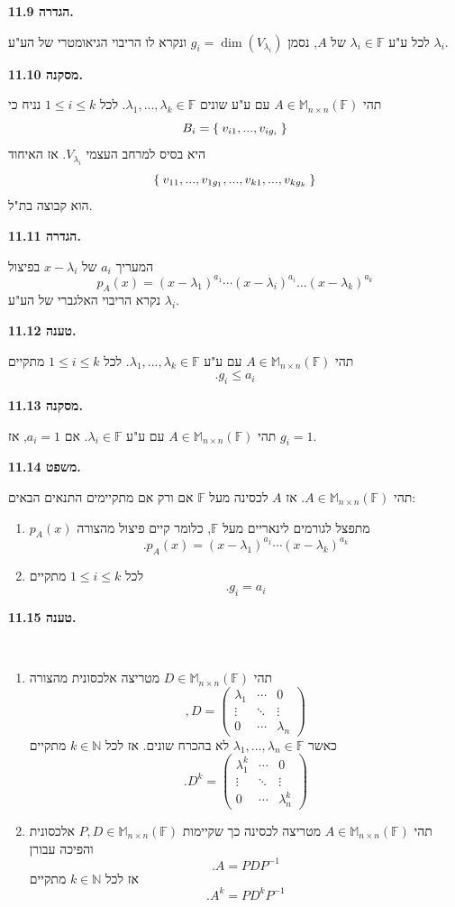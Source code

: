 \documentclass[12pt]{report}
\theoremstyle{plain}
\theoremstyle{definition}
\newcommand{\N}{\mathbb{N}}
\newcommand{\F}{\mathbb{F}}
\newcommand{\M}{\mathbb{M}}
\newcommand{\0}{\mathbf{0}}
\begin{document}
\noindent\textbf{הגדרה 11.9.}

לכל ע"ע
$\lambda_i\in\F$
של
$A$,
נסמן
$g_i=\dim(V_{\lambda_i})$
ונקרא לו הריבוי הגיאומטרי של הע"ע
$\lambda_i$.
\bigskip
\bigskip

\noindent\textbf{מסקנה 11.10.}

תהי
$A\in\M_{n\times n}(\F)$
עם ע"ע שונים
$\lambda_1,...,\lambda_k\in\F$.
לכל 
$1\leq i\leq k$
נניח כי
$$
B_i=\Set{v_{i1},...,v_{ig_i}}
$$
היא בסיס למרחב העצמי 
$V_{\lambda_i}$.
אז האיחוד
$$
\Set{v_{11},...,v_{1g_1},...,v_{k1},...,v_{kg_k}}
$$
הוא קבוצה בת"ל.
\bigskip
\bigskip

\noindent\textbf{הגדרה 11.11.}

המעריך 
$a_i$
של
$x-\lambda_i$
בפיצול
$$
p_A(x)=(x-\lambda_1)^{a_1}\cdots(x-\lambda_i)^{a_i}\dots(x-\lambda_k)^{a_k}
$$
נקרא הריבוי האלגברי של הע"ע
$\lambda_i$.
\bigskip
\bigskip

\noindent\textbf{טענה 11.12.}

תהי
$A\in\M_{n\times n}(\F)$
עם ע"ע
$\lambda_1,...,\lambda_k\in\F$.
לכל
$1\leq i\leq k$
מתקיים
$$
.g_i\leq a_i
$$
\bigskip
\bigskip

\noindent\textbf{מסקנה 11.13.}

תהי
$A\in\M_{n\times n}(\F)$
עם ע"ע
$\lambda_i\in\F$.
אם
$a_i=1$,
אז 
$g_i=1$.
\bigskip
\bigskip

\noindent\textbf{משפט 11.14.}

תהי
$A\in\M_{n\times n}(\F)$.
אז
$A$
לכסינה מעל
$\F$
אם ורק אם מתקיימים התנאים הבאים:
\begin{enumerate}[label=\alph*.]
\item 
$p_A(x)$
מתפצל לגורמים לינאריים מעל
$\F$, 
כלומר קיים פיצול מהצורה
$$
.p_A(x)=(x-\lambda_1)^{a_1}\cdots(x-\lambda_k)^{a_k}
$$


\item 
לכל
$1\leq i\leq k$
מתקיים
$$
.g_i=a_i
$$


\end{enumerate}
\bigskip
\bigskip

\noindent\textbf{טענה 11.15.}

\label{prop:matrix-power}\
\begin{enumerate}[label=\alph*.]
\item 
תהי
$D\in\M_{n\times n}(\F)$
מטריצה אלכסונית מהצורה
$$
,D=\begin{pmatrix}
\lambda_1 & \cdots & 0 \\
\vdots & \ddots & \vdots \\
0 & \cdots & \lambda_n
\end{pmatrix}
$$
כאשר 
$\lambda_1,...,\lambda_n\in\F$
לא בהכרח שונים.
אז לכל
$k\in\N$
מתקיים
$$
.D^k=\begin{pmatrix}
\lambda_1^k & \cdots & 0 \\
\vdots & \ddots & \vdots \\
0 & \cdots & \lambda_n^k
\end{pmatrix}
$$


\item 
תהי
$A\in\M_{n\times n}(\F)$
מטריצה לכסינה כך שקיימות
$P,D\in\M_{n\times n}(\F)$
אלכסונית והפיכה עבורן
$$
.A=PDP^{-1}
$$
אז לכל
$k\in\N$
מתקיים
$$
.A^k=PD^kP^{-1}
$$


\end{enumerate}
\bigskip
\bigskip
\end{document}
